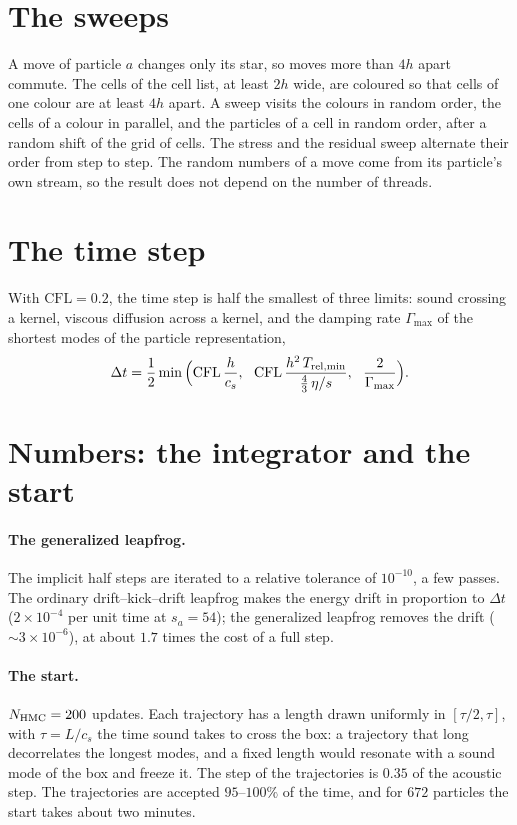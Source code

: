 \documentclass[11pt,aps,preprint,nofootinbib,superscriptaddress,tightenlines]{revtex4-2}
\def\st{\begin{equation}}
\def\stp{\end{equation}}
\let\oldparagraph\paragraph
\renewcommand{\paragraph}{\par\bigskip\oldparagraph}
\begin{document}
\section{The sweeps}
\label{app:sweeps}

A move of particle $a$ changes only its star, so moves more than $4h$ apart commute.  The cells of the cell list, at least $2h$ wide, are
coloured so that cells of one colour are at least $4h$ apart.  A sweep visits the colours in random order, the cells of a colour in parallel,
and the particles of a cell in random order, after a random shift of the grid of cells.  The stress and the residual sweep alternate their
order from step to step.  The random numbers of a move come from its particle's own stream, so the result does not depend on the number of
threads.

\section{The time step}
\label{app:dt}

With $\mathrm{CFL}=0.2$, the time step is half the smallest of three limits: sound crossing a kernel, viscous diffusion across a kernel, and the
damping rate $\Gamma_{\max}$ of the shortest modes of the particle representation,
\st
\Delta t=\frac12\min\Big(\mathrm{CFL}\,\frac h{c_s},\ \ \mathrm{CFL}\,\frac{h^2\,T_{\rm rel,min}}{\frac43\,\eta/s},\ \ \frac2{\Gamma_{\max}}\Big).
\stp

\section{Numbers: the integrator and the start}
\label{app:numbers}

\paragraph{The generalized leapfrog.}  The implicit half steps are iterated to a relative tolerance of $10^{-10}$, a few passes.  The ordinary
drift--kick--drift leapfrog makes the energy drift in proportion to $\Delta t$ ($2\times10^{-4}$ per unit time at $s_a=54$); the generalized
leapfrog removes the drift ($\sim3\times10^{-6}$), at about $1.7$ times the cost of a full step.

\paragraph{The start.}  $N_{\rm HMC}=200$ updates.  Each trajectory has a length drawn uniformly in $[\tau/2,\tau]$, with $\tau=L/c_s$ the time sound
takes to cross the box: a trajectory that long decorrelates the longest modes, and a fixed length would resonate with a sound mode of the
box and freeze it.  The step of the trajectories is $0.35$ of the acoustic step.  The trajectories are accepted $95$--$100\%$ of the time, and for
$672$ particles the start takes about two minutes.
\end{document}
